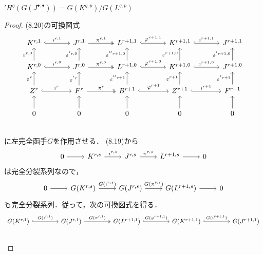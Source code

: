 \begin{screen}
  \('H^q(G(J^{\bullet, \bullet})) = G(K^{q, p}) / G(L^{q, p})\)
\end{screen}
\begin{proof}
  (8.20)の可換図式
  \[
  \begin{tikzcd}[column sep = large]
    K^{r, 1} \arrow[r, "\imath^{r, 1}", hookrightarrow] & J^{r, 1} \arrow[r, "\pi^{r, 1}", twoheadrightarrow] & L^{r+1, 1} \arrow[r, "\varphi^{r+1, 1}", hookrightarrow] & K^{r+1, 1} \arrow[r, "\imath^{r+1, 1}", hookrightarrow] & J^{r+1, 1} \\
    K^{r, 0} \arrow[u, "\varepsilon^{r, 0}"]\arrow[r, "\imath^{r, 0}", hookrightarrow] & J^{r, 0} \arrow[u, "\varepsilon^{'r, 0}"]\arrow[r, "\pi^{r, 0}", twoheadrightarrow] & L^{r+1, 0} \arrow[u, "\varepsilon^{''r+1, 0}"]\arrow[r, "\varphi^{r+1, 0}", hookrightarrow] & K^{r+1, 0} \arrow[u, "\varepsilon^{r+1, 0}"]\arrow[r, "\imath^{r+1, 0}", hookrightarrow] & J^{r+1, 0} \arrow[u, "\varepsilon^{'r+1, 0}"] \\
    Z^r \arrow[u, "\varepsilon^r"]\arrow[r, "\imath^r", hookrightarrow] & F^r \arrow[u, "\varepsilon^{'r}"]\arrow[r, "\pi^r", twoheadrightarrow] & B^{r+1} \arrow[u, "\varepsilon^{''r+1}"]\arrow[r, "\varphi^{r+1}", hookrightarrow] & Z^{r+1} \arrow[u, "\varepsilon^{r+1}"]\arrow[r, "\imath^{r+1}", hookrightarrow] & F^{r+1} \arrow[u, "\varepsilon^{'r+1}"] \\
    0 \arrow[u] & 0 \arrow[u] & 0 \arrow[u] & 0 \arrow[u] & 0 \arrow[u] \\
  \end{tikzcd}
  \]
  に左完全函手\(G\)を作用させる．
  (8.19)から
  \[
  \begin{tikzcd}
    0 \arrow[r] & K^{r, s} \arrow[r, "\imath^{r, s}"] & J^{r, s} \arrow[r, "\pi^{r, s}"] & L^{r+1, s} \arrow[r] & 0
  \end{tikzcd}
  \]
  は完全分裂系列なので，
  \[
  \begin{tikzcd}
    0 \arrow[r] & G(K^{r, s}) \arrow[r, "G(\imath^{r, s})"] & G(J^{r, s}) \arrow[r, "G(\pi^{r, s})"] & G(L^{r+1, s}) \arrow[r] & 0
  \end{tikzcd}
  \]
  も完全分裂系列．従って，次の可換図式を得る．
  \[
  \begin{tikzcd}[column sep = 1.5cm]
    G(K^{r, 1}) \arrow[r, "G(\imath^{r, 1})", hookrightarrow] & G(J^{r, 1}) \arrow[r, "G(\pi^{r, 1})", twoheadrightarrow] & G(L^{r+1, 1}) \arrow[r, "G(\varphi^{r+1, 1})", hookrightarrow] & G(K^{r+1, 1}) \arrow[r, "G(\imath^{r+1, 1})", hookrightarrow] & G(J^{r+1, 1}) \\

\end{tikzcd}\]
\end{proof}
